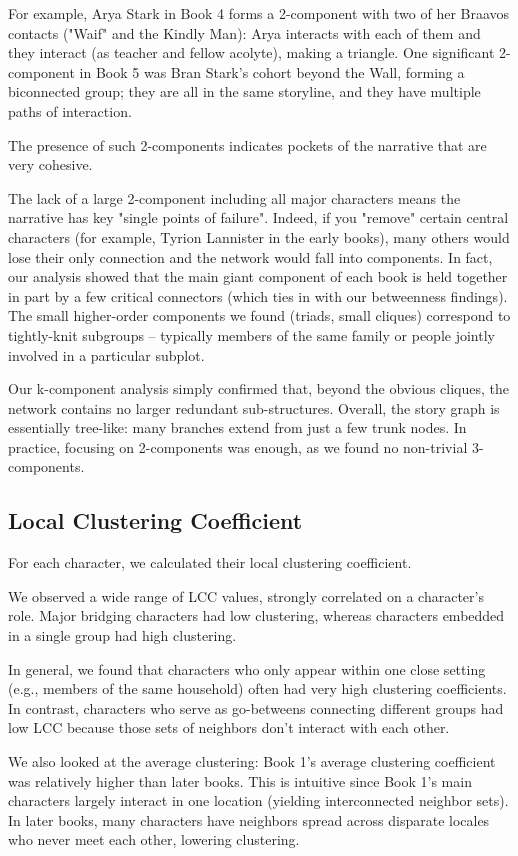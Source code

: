 \documentclass[12pt, a4paper]{article}
\begin{document}
For example, Arya Stark in Book 4 forms a 2-component with two of her Braavos contacts ("Waif" and the Kindly Man): Arya interacts with each of them and they interact (as teacher and fellow acolyte), making a triangle. One significant 2-component in Book 5 was Bran Stark's cohort beyond the Wall, forming a biconnected group; they are all in the same storyline, and they have multiple paths of interaction. 

The presence of such 2-components indicates pockets of the narrative that are very cohesive. 
 
The lack of a large 2-component including all major characters means the narrative has key "single points of failure". Indeed, if you "remove" certain central characters (for example, Tyrion Lannister in the early books), many others would lose their only connection and the network would fall into components. In fact, our analysis showed that the main giant component of each book is held together in part by a few critical connectors (which ties in with our betweenness findings). The small higher-order components we found (triads, small cliques) correspond to tightly-knit subgroups – typically members of the same family or people jointly involved in a particular subplot.

Our k-component analysis simply confirmed that, beyond the obvious cliques, the network contains no larger redundant sub-structures. Overall, the story graph is essentially tree-like: many branches extend from just a few trunk nodes. In practice, focusing on 2-components was enough, as we found no non-trivial 3-components.


\subsection*{Local Clustering Coefficient}
For each character, we calculated their local clustering coefficient.

We observed a wide range of LCC values, strongly correlated on a character's role. Major bridging characters had low clustering, whereas characters embedded in a single group had high clustering. 

In general, we found that characters who only appear within one close setting (e.g., members of the same household) often had very high clustering coefficients. In contrast, characters who serve as go-betweens connecting different groups had low LCC because those sets of neighbors don't interact with each other. 

We also looked at the average clustering: Book 1's average clustering coefficient was relatively higher than later books. This is intuitive since Book 1's main characters largely interact in one location (yielding interconnected neighbor sets). In later books, many characters have neighbors spread across disparate locales who never meet each other, lowering clustering. 
\end{document}
